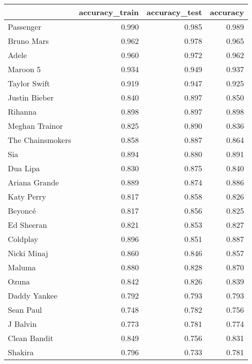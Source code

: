 \begin{tabular}{lrrr}
\toprule
{} &  accuracy\_train &  accuracy\_test &  accuracy \\
\midrule
Passenger        &           0.990 &          0.985 &     0.989 \\
Bruno Mars       &           0.962 &          0.978 &     0.965 \\
Adele            &           0.960 &          0.972 &     0.962 \\
Maroon 5         &           0.934 &          0.949 &     0.937 \\
Taylor Swift     &           0.919 &          0.947 &     0.925 \\
Justin Bieber    &           0.840 &          0.897 &     0.850 \\
Rihanna          &           0.898 &          0.897 &     0.898 \\
Meghan Trainor   &           0.825 &          0.890 &     0.836 \\
The Chainsmokers &           0.858 &          0.887 &     0.864 \\
Sia              &           0.894 &          0.880 &     0.891 \\
Dua Lipa         &           0.830 &          0.875 &     0.840 \\
Ariana Grande    &           0.889 &          0.874 &     0.886 \\
Katy Perry       &           0.817 &          0.858 &     0.826 \\
Beyoncé          &           0.817 &          0.856 &     0.825 \\
Ed Sheeran       &           0.821 &          0.853 &     0.827 \\
Coldplay         &           0.896 &          0.851 &     0.887 \\
Nicki Minaj      &           0.860 &          0.846 &     0.857 \\
Maluma           &           0.880 &          0.828 &     0.870 \\
Ozuna            &           0.842 &          0.826 &     0.839 \\
Daddy Yankee     &           0.792 &          0.793 &     0.793 \\
Sean Paul        &           0.748 &          0.782 &     0.756 \\
J Balvin         &           0.773 &          0.781 &     0.774 \\
Clean Bandit     &           0.849 &          0.756 &     0.831 \\
Shakira          &           0.796 &          0.733 &     0.781 \\
\bottomrule
\end{tabular}
